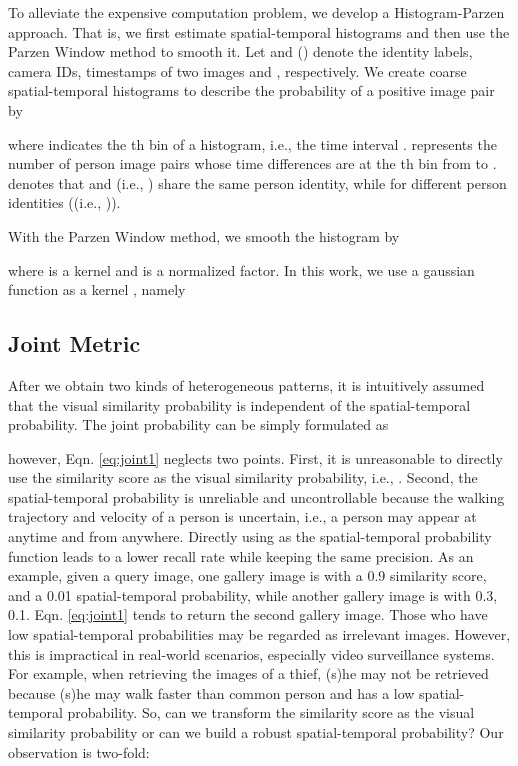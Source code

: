 \documentclass[letterpaper]{article} \usepackage{aaai19}  \usepackage{times}  \usepackage{helvet}  \usepackage{courier}  \usepackage{url}  \usepackage{graphicx}  \usepackage{subfig}
\begin{document}
To alleviate the expensive computation problem, we develop a Histogram-Parzen approach. That is, we first estimate spatial-temporal histograms and then use the Parzen Window method to smooth it. Let  and  () denote the identity labels, camera IDs, timestamps of two images  and , respectively. We create coarse spatial-temporal histograms to describe the probability of a positive image pair by

where  indicates the th bin of a histogram, i.e., the time interval .  represents the number of person image pairs whose time differences are at the th bin from  to .  denotes that  and  (i.e., ) share the same person identity, while  for different person identities ((i.e., )).

With the Parzen Window method, we smooth the histogram by

where  is a kernel and  is a normalized factor. In this work, we use a gaussian function as a kernel , namely

\subsection{Joint Metric}
After we obtain two kinds of heterogeneous patterns, it is intuitively assumed that the visual similarity probability is independent of the spatial-temporal probability. The joint probability can be simply formulated as

however, Eqn. \ref{eq:joint1} neglects two points. First, it is unreasonable to directly use the similarity score as the visual similarity probability, i.e., . Second, the spatial-temporal probability  is unreliable and uncontrollable because the walking trajectory and velocity of a person is uncertain, i.e., a person may appear at anytime and from anywhere. Directly using  as the spatial-temporal probability function leads to a lower recall rate while keeping the same precision. As an example, given a query image, one gallery image is with a 0.9 similarity score, and a 0.01 spatial-temporal probability, while another gallery image is with 0.3, 0.1. Eqn. \ref{eq:joint1} tends to return the second gallery image. Those who have low spatial-temporal probabilities may be regarded as irrelevant images. However, this is impractical in real-world scenarios, especially video surveillance systems. For example, when retrieving the images of a thief, (s)he may not be retrieved because (s)he may walk faster than common person and has a low spatial-temporal probability. So, can we transform the similarity score as the visual similarity probability or can we build a robust spatial-temporal probability? Our observation is two-fold:
\end{document}
